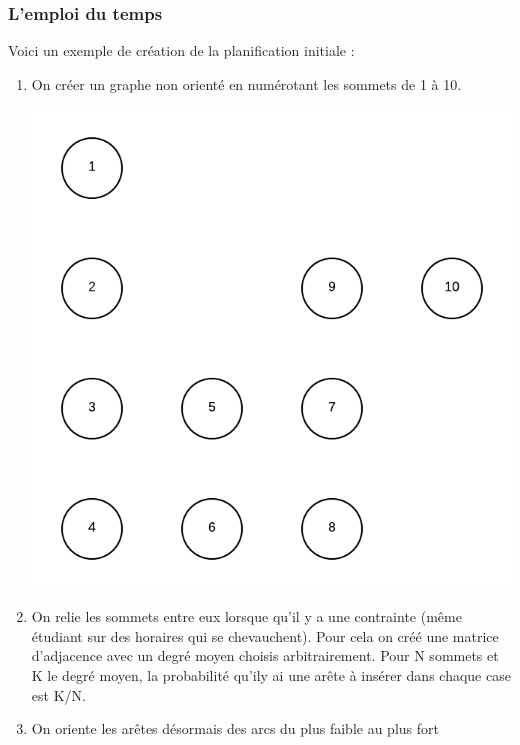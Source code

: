 \documentclass[a4paper,11pt]{article}
\begin{document}
		\subsubsection{L'emploi du temps}
			Voici un exemple de création de la planification initiale : 
			\begin{enumerate}
				\item On créer un graphe non orienté en numérotant les sommets de 1 à 10.
				\centerline{\includegraphics[scale=0.8]{Captures/exemple1.png}}
				\item On relie les sommets entre eux lorsque qu'il y a une contrainte (même étudiant sur des horaires qui se chevauchent). Pour cela on créé une matrice d'adjacence avec un degré moyen choisis arbitrairement. Pour N sommets et K le degré moyen, la probabilité qu'ily ai une arête à insérer dans chaque case est K/N.
				\item On oriente les arêtes désormais des arcs du plus faible au plus fort

\end{enumerate}
\end{document}
